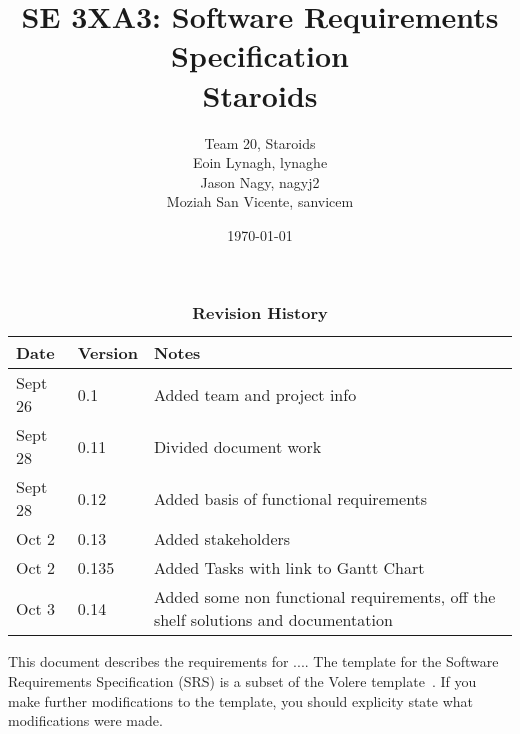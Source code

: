 \documentclass[12pt, titlepage]{article}
\title{SE 3XA3: Software Requirements Specification\\Staroids}
\author{Team 20, Staroids
		\\ Eoin Lynagh, lynaghe
		\\ Jason Nagy, nagyj2
		\\ Moziah San Vicente, sanvicem
}
\date{\today}
\begin{document}
\maketitle

\tableofcontents
\listoftables
\listoffigures

\begin{table}[bp]
\caption{\bf Revision History}
\begin{tabularx}{\textwidth}{p{3cm}p{2cm}X}
\toprule {\bf Date} & {\bf Version} & {\bf Notes}\\
\midrule
Sept 26 & 0.1 & Added team and project info\\
Sept 28 & 0.11 & Divided document work\\
Sept 28 & 0.12 & Added basis of functional requirements\\
Oct 2 & 0.13 & Added stakeholders\\
Oct 2 & 0.135 & Added Tasks with link to Gantt Chart\\
Oct 3 & 0.14 & Added some non functional requirements, off the shelf solutions and documentation\\
\bottomrule
\end{tabularx}
\end{table}

\newpage






This document describes the requirements for ....  The template for the Software
Requirements Specification (SRS) is a subset of the Volere
template~\citep{RobertsonAndRobertson2012}.  If you make further modifications
to the template, you should explicity state what modifications were made.
\end{document}
